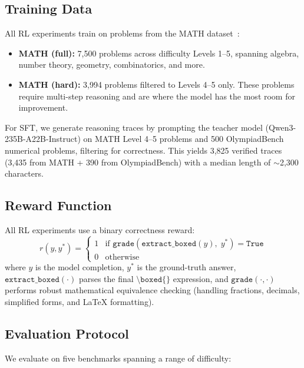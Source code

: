 \documentclass[11pt,a4paper]{article}
\newcommand{\teachername}{Qwen3-235B-A22B-Instruct}
\newcommand{\boxedcmd}{\texttt{\textbackslash boxed\{\}}}
\begin{document}
\subsection{Training Data}

All RL experiments train on problems from the MATH dataset~\citep{hendrycks2021measuring}:
\begin{itemize}[leftmargin=*]
    \item \textbf{MATH (full):} 7,500 problems across difficulty Levels 1--5, spanning algebra, number theory, geometry, combinatorics, and more.
    \item \textbf{MATH (hard):} 3,994 problems filtered to Levels 4--5 only. These problems require multi-step reasoning and are where the model has the most room for improvement.
\end{itemize}

For SFT, we generate reasoning traces by prompting the teacher model (\teachername{}) on MATH Level 4--5 problems and 500 OlympiadBench~\citep{he2024olympiadbench} numerical problems, filtering for correctness. This yields 3,825 verified traces (3,435 from MATH + 390 from OlympiadBench) with a median length of $\sim$2,300 characters.

\subsection{Reward Function}

All RL experiments use a binary correctness reward:
\begin{equation}
    r(y, y^*) = \begin{cases} 1 & \text{if } \texttt{grade}(\texttt{extract\_boxed}(y),\; y^*) = \texttt{True} \\ 0 & \text{otherwise} \end{cases}
\end{equation}
where $y$ is the model completion, $y^*$ is the ground-truth answer, $\texttt{extract\_boxed}(\cdot)$ parses the final $\boxedcmd{}$ expression, and $\texttt{grade}(\cdot, \cdot)$ performs robust mathematical equivalence checking (handling fractions, decimals, simplified forms, and LaTeX formatting).

\subsection{Evaluation Protocol}

We evaluate on five benchmarks spanning a range of difficulty:
\end{document}
